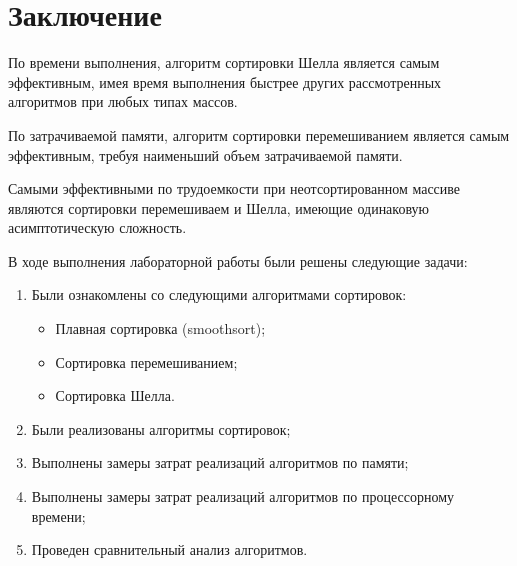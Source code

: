 \chapter*{Заключение}

По времени выполнения, алгоритм сортировки Шелла является самым эффективным, имея время выполнения быстрее других рассмотренных алгоритмов при любых типах массов.

По затрачиваемой памяти, алгоритм сортировки перемешиванием является самым эффективным, требуя наименьший объем затрачиваемой памяти.

Самыми эффективными по трудоемкости при неотсортированном массиве являются сортировки перемешиваем и Шелла, имеющие одинаковую асимптотическую сложность.

В ходе выполнения лабораторной работы были решены следующие задачи:

\begin{enumerate}
    \item Были ознакомлены со следующими алгоритмами сортировок:
    \begin{itemize}    
        \item Плавная сортировка (smoothsort);
        \item Сортировка перемешиванием;
        \item Сортировка Шелла.
    \end{itemize}
    \item Были реализованы алгоритмы сортировок;
    \item Выполнены замеры затрат реализаций алгоритмов по памяти;
    \item Выполнены замеры затрат реализаций алгоритмов по процессорному времени;
    \item Проведен сравнительный анализ алгоритмов.
\end{enumerate}